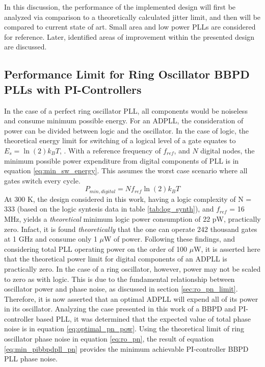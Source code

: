In this discussion, the performance of the implemented design will first be analyzed via comparison to a theoretically calculated jitter limit, and then will be compared to current state of art. Small area and low power PLLs are considered for reference. Later, identified areas of improvement within the presented design are discussed.

\subsection{Performance Limit for Ring Oscillator BBPD PLLs with PI-Controllers}\label{sec:fomjit_limit}
	In the case of a perfect ring oscillator PLL, all components would be noiseless and consume minimum possible energy. For an ADPLL, the consideration of power can be divided between logic and the oscillator. In the case of logic, the theoretical energy limit for switching of a logical level of a gate equates to $E_s = \ln(2) k_B T$, \cite{Lundstrom2006}. With a reference frequency of $f_{ref}$, and $N$ digital nodes, the minimum possible power expenditure from digital components of PLL is in equation \ref{eq:min_sw_energy}. This assumes the worst case scenario where all gates switch every cycle.
	\begin{equation}\label{eq:min_sw_energy}
		P_{min,digital} = Nf_{ref}\ln(2) k_B T
	\end{equation}
	At 300 K, the design considered in this work, having a logic complexity of N = 333 (based on the logic syntesis data in table \ref{tab:log_synth}), and $f_{ref}$ = 16 MHz, yields a \textit{theoretical} minimum logic power consumption of 22 pW, practically zero. Infact, it is found \textit{theoretically} that the one can operate 242 thousand gates at 1 GHz and consume only 1 $\mu$W of power. Following these findings, and considering total PLL operating power on the order of 100 $\mu$W, it is asserted here that the theoretical power limit for digital components of an ADPLL is practically zero. In the case of a ring oscillator, however, power may not be scaled to zero as with logic. This is due to the fundamental relationship between oscillator power and phase noise, as discussed in section \ref{sec:ro_pn_limit}. Therefore, it is now asserted that an optimal ADPLL will expend all of its power in its oscillator. Analyzing the case presented in this work of a BBPD and PI-controller based PLL, it was determined that the expected value of total phase noise is in equation \ref{eq:optimal_pn_pow}. Using the theoretical limit of ring oscillator phase noise in equation \ref{eq:ro_pn}, the result of equation \ref{eq:min_pibbpdpll_pn} provides the minimum achievable PI-controller BBPD PLL phase noise.
